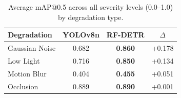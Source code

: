 \begin{table}[htbp]
\centering
\caption{Average mAP@0.5 across all severity levels (0.0--1.0) by degradation type.}
\label{tab:degradation_avg}
\begin{tabular}{lccc}
\hline
\textbf{Degradation} & \textbf{YOLOv8n} & \textbf{RF-DETR} & \textbf{$\Delta$} \\
\hline
Gaussian Noise & 0.682 & \textbf{0.860} & +0.178 \\
Low Light & 0.716 & \textbf{0.850} & +0.134 \\
Motion Blur & 0.404 & \textbf{0.455} & +0.051 \\
Occlusion & 0.889 & \textbf{0.890} & +0.001 \\
\hline
\end{tabular}
\end{table}